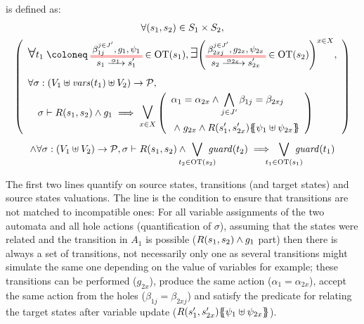 \documentclass{article}
\begin{document}
\begin{defi}
  is defined as: %
\begin{multline*}
	\forall \mpar{s_1, s_2} \in S_1 \times S_2, \\
	\mpar{\everymath{\displaystyle}\begin{array}{l}
		\bigsymb{\forall} t_1 \defobject \OTx{1}{}{1}{} \in \fOT{s_1}, \bigsymb{\exists} \mpar{\OTx{2}{x}{2x}{} \in \fOT{s_2}}^{x \in X}, \\[12pt]
		\forall \sigma: \mpar{V_1 \uplus \fvars{t_1} \uplus V_2} \to \values, \\
		\quad \sigma \vdash R\mpar{s_1, s_2} \wedge g_1 \implies \operatorname*{\bigsymb{\bigvee}}_{x \in X} \mpar{\begin{array}{l}
			\alpha_1 = \alpha_{2x} \wedge \bigwedge_{j \in J'} \beta_{1j} = \beta_{2xj} \\[12pt]
			\nwedge g_{2x} \wedge R\mpar{s'_1, s'_{2x}}\psubst{\psi_1 \uplus \psi_{2x}}
		\end{array}} \\[12pt]
	\end{array}} \\
	\wedge \forall \sigma: \mpar{V_1 \uplus V_2} \to \values, \sigma \vdash R\mpar{s_1, s_2} \wedge \bigvee_\subbox{t_2 \in \fOT{s_2}} \fguard{t_2} \implies \bigvee_\subbox{t_1 \in \fOT{s_1}} \fguard{t_1}
\end{multline*}
\end{defi}
The first two lines quantify on source states, transitions (and target states) and source states valuations.
The  line is the condition to ensure that transitions are not matched to incompatible ones:
For all variable assignments of the two automata and all hole actions (quantification of \(\sigma\)), assuming that the states were related and the transition in \(A_1\) is possible (\(R{\left(s_1, s_2\right)} \wedge g_1\) part) then there is always a set of transitions, not necessarily only one as several transitions might simulate the same one depending on the value of variables for example; these transitions can be performed (\(g_{2x}\)), produce the same action (\(\alpha_1 = \alpha_{2x}\)), accept the same action from the holes (\(\beta_{1j} = \beta_{2xj}\)) and satisfy the predicate for relating the target states after variable update (\(R{\left(s'_1, s'_{2x}\right)}{\left\{\!\!{\left\{\psi_1 \uplus \psi_{2x}\right\}}\!\!\right\}}\)).
\end{document}
